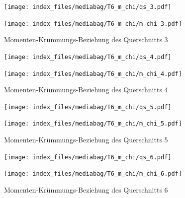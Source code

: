 \documentclass[
  11pt,
  letterpaper,
]{scrreprt}
\begin{document}
\begin{figure}[H]

\begin{minipage}{0.50\linewidth}
\texttt{[image: index\_files/mediabag/T6\_m\_chi/qs\_3.pdf]}\end{minipage}%
%
\begin{minipage}{0.50\linewidth}
\texttt{[image: index\_files/mediabag/T6\_m\_chi/m\_chi\_3.pdf]}\end{minipage}%

\caption{\label{fig-m_chi_appendix}Momenten-Krümmungs-Beziehung des
Querschnitts 3}

\end{figure}%

\begin{figure}[H]

\begin{minipage}{0.50\linewidth}
\texttt{[image: index\_files/mediabag/T6\_m\_chi/qs\_4.pdf]}\end{minipage}%
%
\begin{minipage}{0.50\linewidth}
\texttt{[image: index\_files/mediabag/T6\_m\_chi/m\_chi\_4.pdf]}\end{minipage}%

\caption{\label{fig-m_chi_appendix}Momenten-Krümmungs-Beziehung des
Querschnitts 4}

\end{figure}%

\begin{figure}[H]

\begin{minipage}{0.50\linewidth}
\texttt{[image: index\_files/mediabag/T6\_m\_chi/qs\_5.pdf]}\end{minipage}%
%
\begin{minipage}{0.50\linewidth}
\texttt{[image: index\_files/mediabag/T6\_m\_chi/m\_chi\_5.pdf]}\end{minipage}%

\caption{\label{fig-m_chi_appendix}Momenten-Krümmungs-Beziehung des
Querschnitts 5}

\end{figure}%

\begin{figure}[H]

\begin{minipage}{0.50\linewidth}
\texttt{[image: index\_files/mediabag/T6\_m\_chi/qs\_6.pdf]}\end{minipage}%
%
\begin{minipage}{0.50\linewidth}
\texttt{[image: index\_files/mediabag/T6\_m\_chi/m\_chi\_6.pdf]}\end{minipage}%

\caption{\label{fig-m_chi_appendix}Momenten-Krümmungs-Beziehung des
Querschnitts 6}

\end{figure}%
\end{document}

